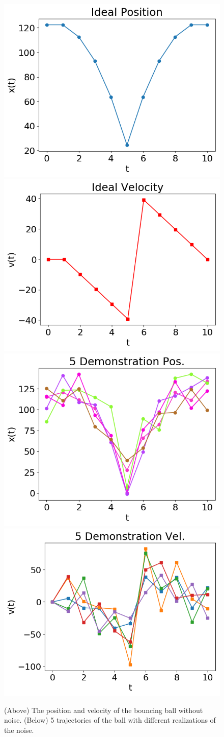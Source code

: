 \begin{figure}[ht!]%
\centering
\includegraphics[width=0.48\columnwidth]{tsc-experiments/a.png}
\includegraphics[width=0.48\columnwidth]{tsc-experiments/b.png}
\includegraphics[width=0.48\columnwidth]{tsc-experiments/c.png}
\includegraphics[width=0.48\columnwidth]{tsc-experiments/d.png}
\caption{(Above) The position and velocity of the bouncing ball without noise. (Below) 5 trajectories of the ball with different realizations of the noise. \label{ball-diagram}}
\end{figure}

